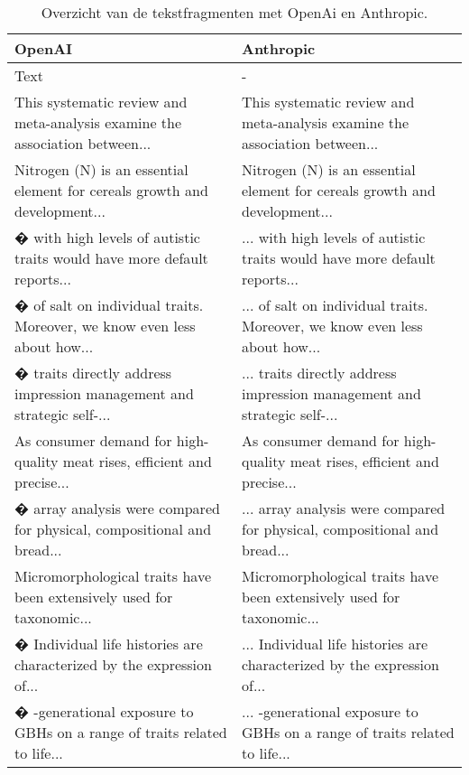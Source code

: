 \begin{table}[h!]
    \caption{Overzicht van de tekstfragmenten met OpenAi en Anthropic.}
    \centering
    \begin{tabularx}{\textwidth}{|X|X|} 
        \hline
        \rowcolor{lightgray}
        OpenAI & Anthropic \\ 
        \hline
        \rowcolor{lightgray}
        Text & - \\ 
        \hline
        This systematic review and meta-analysis examine the association between... & This systematic review and meta-analysis examine the association between... \\ 
        Nitrogen (N) is an essential element for cereals growth and development... & Nitrogen (N) is an essential element for cereals growth and development... \\
        � with high levels of autistic traits would have more default reports... & ... with high levels of autistic traits would have more default reports... \\
        � of salt on individual traits. Moreover, we know even less about how... & ... of salt on individual traits. Moreover, we know even less about how... \\
        � traits directly address impression management and strategic self-... & ... traits directly address impression management and strategic self-... \\
        As consumer demand for high-quality meat rises, efficient and precise... & As consumer demand for high-quality meat rises, efficient and precise... \\
        � array analysis were compared for physical, compositional and bread... & ... array analysis were compared for physical, compositional and bread... \\
        Micromorphological traits have been extensively used for taxonomic... & Micromorphological traits have been extensively used for taxonomic... \\
        � Individual life histories are characterized by the expression of... & ... Individual life histories are characterized by the expression of... \\
        � -generational exposure to GBHs on a range of traits related to life... & ... -generational exposure to GBHs on a range of traits related to life... \\
        \hline
    \end{tabularx}
    \label{table:llmTekst}
\end{table}
